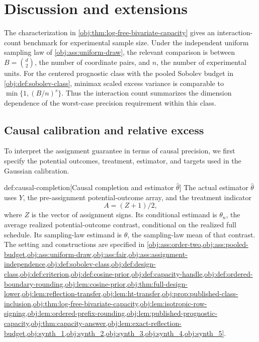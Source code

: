 \section{Discussion and extensions}

The characterization in \cref{obj:thm:log-free-bivariate-capacity} gives an interaction-count benchmark for experimental sample size. Under the independent uniform sampling law of \cref{obj:ass:uniform-draw}, the relevant comparison is between \(B=\binom d2\), the number of coordinate pairs, and \(n\), the number of experimental units. For the centered prognostic class with the pooled Sobolev budget in \cref{obj:def:sobolev-class}, minimax scaled excess variance is comparable to \(\min\{1,(B/n)^s\}\). Thus the interaction count summarizes the dimension dependence of the worst-case precision requirement within this class.

\subsection{Causal calibration and relative excess}

To interpret the assignment guarantee in terms of causal precision, we first specify the potential outcomes, treatment, estimator, and targets used in the Gaussian calibration.

\begin{definitionv}{def:causal-completion}[Causal completion and estimator \(\widehat\theta\)]
The actual estimator \(\widehat\theta\) uses \(Y\), the pre-assignment potential-outcome array, and the treatment indicator
\[
A=(Z+1)/2,
\]
where \(Z\) is the vector of assignment signs. Its conditional estimand is \(\theta_n\), the average realized potential-outcome contrast, conditional on the realized full schedule. Its sampling-law estimand is \(\theta\), the sampling-law mean of that contrast. The setting and constructions are specified in \cref{obj:ass:order-two,obj:ass:pooled-budget,obj:ass:uniform-draw,obj:ass:fair,obj:ass:assignment-independence,obj:def:sobolev-class,obj:def:design-class,obj:def:criterion,obj:def:cosine-prior,obj:def:capacity-handle,obj:def:ordered-boundary-rounding,obj:lem:cosine-prior,obj:thm:full-design-lower,obj:lem:reflection-transfer,obj:lem:ht-transfer,obj:prop:published-class-inclusion,obj:thm:log-free-bivariate-capacity,obj:lem:isotropic-row-signing,obj:lem:ordered-prefix-rounding,obj:lem:published-prognostic-capacity,obj:thm:capacity-answer,obj:lem:exact-reflection-budget,obj:synth_1,obj:synth_2,obj:synth_3,obj:synth_4,obj:synth_5}.
\end{definitionv}

